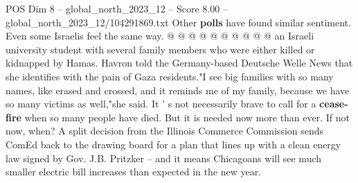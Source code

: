 \begin{textsample}{POS Dim 8 – global\_north\_2023\_12 – Score 8.00 – global\_north\_2023\_12/104291869.txt}
Other \textbf{polls} have found similar sentiment.
Even some Israelis feel the same way. @ @ @ @ @ @ @ @ @ @ an Israeli university student with several family members who were either killed or kidnapped by Hamas.
Havron told the Germany-based Deutsche Welle News that she identifies with the pain of Gaza residents."I see big families with so many names, like erased and crossed, and it reminds me of my family, because we have so many victims as well,"she said.
It ' s not necessarily brave to call for a \textbf{cease-fire} when so many people have died.
But it is needed now more than ever.
If not now, when?
A split decision from the Illinois Commerce Commission sends ComEd back to the drawing board for a plan that lines up with a clean energy law signed by Gov.
J.B.
Pritzker -- and it means Chicagoans will see much smaller electric bill increases than expected in the new year.

\end{textsample}
